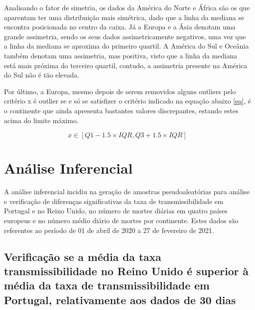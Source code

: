 \documentclass[conference]{IEEEtran}
\begin{document}
Analisando o fator de simetria, os dados da América do Norte e África são os que aparentam ter uma distribuição mais simétrica, dado que a linha da mediana se encontra posicionada no centro da caixa. Já a Europa e a Ásia denotam uma grande assimetria, sendo os seus dados assimetricamente negativos, uma vez que a linha da mediana se aproxima do primeiro quartil. A América do Sul e Oceânia também denotam uma assimetria, mas positiva, visto que a linha da mediana está mais próxima do terceiro quartil, contudo, a assimetria presente na América do Sul não é tão elevada.

Por último, a Europa, mesmo depois de serem removidos alguns outliers pelo critério x é outlier se e só se satisfizer o critério indicado na equação abaixo \eqref{eq}, é o continente que ainda apresenta bastantes valores discrepantes, estando estes acima do limite máximo.

\begin{equation}
x\in [Q1-1.5\times IQR, Q3+1.5\times IQR]\label{eq}
\end{equation}



\section{Análise Inferencial} %
A análise inferencial incidiu na geração de amostras pseudoaleatórias para análise e verificação de diferenças significativas da taxa de transmissibilidade em Portugal e no Reino Unido, no número de mortes diárias em quatro países europeus e no número médio diário de mortes por continente. Estes dados são referentes ao período de 01 de abril de 2020 a 27 de fevereiro de 2021.

\subsection{Verificação se a média da taxa transmissibilidade no Reino Unido é superior à média da taxa de transmissibilidade em Portugal, relativamente aos dados de 30 dias}
\end{document}
